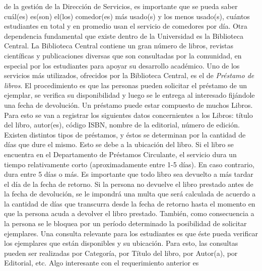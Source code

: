 \message{ !name(InformeFase2.tex)}\documentclass[12pt,a4paper,spanish]{article}
\begin{document}
de la gesti\'on de la Direcci\'on de Servicios, es importante que se pueda saber
cu\'al(es) es(son) el(los) comedor(es) m\'as usado(s) y los menos
usado(s), cu\'antos estudiantes en total y en promedio usan el servicio de comedores por
d\'ia.
\newline
\newline
\indent Otra dependencia fundamental que existe dentro de la
Universidad es la Biblioteca Central. La Biblioteca
Central contiene un gran n\'umero de libros, revistas cient\'ificas y 
publicaciones diversas que son consultadas por la comunidad, en
especial por los estudiantes para apoyar su desarrollo acad\'emico.
\newline
\newline
\indent Uno de los servicios m\'as utilizados, ofrecidos por la Biblioteca Central, 
es el de \emph{Pr\'estamo de libros}. El procedimiento es que las personas pueden solicitar
el pr\'estamo de un ejemplar, se verifica su disponibilidad y luego
se le entrega al interesado fij\'andole una fecha de devoluci\'on. Un
pr\'estamo puede estar compuesto de muchos Libros. Para esto se van a registrar los
siguientes datos concernientes a los Libros: t\'itulo del libro,
autor(es), c\'odigo ISBN, nombre de la editorial, n\'umero de
edici\'on. Existen distintos tipos de pr\'estamos, y \'estos se
determinan por la cantidad de d\'ias que dure el mismo. Esto se debe a
la ubicaci\'on del libro. Si el libro se encuentra en el Departamento
de Pr\'estamos Circulante, el servicio dura un tiempo relativamente
corto (aproximadamente entre 1-5 d\'ias). En caso contrario, dura entre 5 d\'ias o m\'as. 
\newline
\newline
\indent Es importante que todo libro sea devuelto a
m\'as tardar el d\'ia de la fecha de retorno. Si la persona no devuelve el libro
prestado antes de la fecha de devoluci\'on, se le impondr\'a una multa que
ser\'a calculada de acuerdo a la cantidad de d\'ias que transcurra
desde la fecha de retorno hasta el momento en que la persona acuda a
devolver el libro prestado. Tambi\'en, como consecuencia a la persona se le
bloquea por un per\'iodo determinado la posibilidad de solicitar ejemplares.   
\newline
\newline
\indent Una consulta relevante para los estudiantes es que \'este
 pueda verificar los ejemplares que est\'an disponibles y su
ubicaci\'on. Para esto, las consultas pueden ser realizadas por
Categor\'ia, por T\'itulo del libro, por Autor(a), por Editorial, etc. Algo interesante con el requerimiento anterior es
\end{document}
